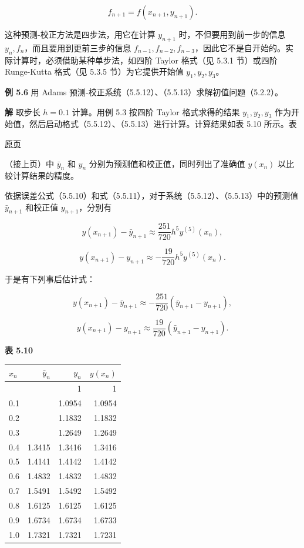 \documentclass[
  10pt,
  fontset=fandol]{ctexart}
\newcounter{none} %
\begin{document}
\[
f_{n+1}=f(x_{n+1},y_{n+1}).
\]

这种预测-校正方法是四步法，用它在计算 \(y_{n+1}\) 时，不但要用到前一步的信息 \(y_n,f_n\)，而且要用到更前三步的信息 \(f_{n-1},f_{n-2},f_{n-3}\)，因此它不是自开始的。实际计算时，必须借助某种单步法，如四阶 Taylor 格式（见 5.3.1 节）或四阶 Runge-Kutta 格式（见 5.3.5 节）为它提供开始值 \(y_1,y_2,y_3\)。

\textbf{例 5.6} 用 Adams 预测-校正系统（5.5.12）、（5.5.13）求解初值问题（5.2.2）。

\textbf{解} 取步长 \(h=0.1\) 计算。用例 5.3 按四阶 Taylor 格式求得的结果 \(y_1,y_2,y_3\) 作为开始值，然后启动格式（5.5.12）、（5.5.13）进行计算。计算结果如表 5.10 所示。表

\href{../../source-images/pdf-141.jpeg}{原页}

（接上页）中 \(\bar y_n\) 和 \(y_n\) 分别为预测值和校正值，同时列出了准确值 \(y(x_n)\) 以比较计算结果的精度。

依据误差公式（5.5.10）和式（5.5.11），对于系统（5.5.12）、（5.5.13）中的预测值 \(\bar y_{n+1}\) 和校正值 \(y_{n+1}\)，分别有

\[
y(x_{n+1})-\bar y_{n+1}\approx\frac{251}{720}h^5y^{(5)}(x_n),
\]

\[
y(x_{n+1})-y_{n+1}\approx-\frac{19}{720}h^5y^{(5)}(x_n).
\]

于是有下列事后估计式：

\[
y(x_{n+1})-\bar y_{n+1}\approx-\frac{251}{720}(\bar y_{n+1}-y_{n+1}),
\]

\[
y(x_{n+1})-y_{n+1}\approx\frac{19}{720}(\bar y_{n+1}-y_{n+1}).
\]

\textbf{表 5.10}

{\def\LTcaptype{none} %
\begin{longtable}[]{@{}lrrr@{}}
\toprule\noalign{}
\(x_n\) & \(\bar y_n\) & \(y_n\) & \(y(x_n)\) \\
\midrule\noalign{}
\endhead
\bottomrule\noalign{}
\endlastfoot
0 & & 1 & 1 \\
0.1 & & 1.0954 & 1.0954 \\
0.2 & & 1.1832 & 1.1832 \\
0.3 & & 1.2649 & 1.2649 \\
0.4 & 1.3415 & 1.3416 & 1.3416 \\
0.5 & 1.4141 & 1.4142 & 1.4142 \\
0.6 & 1.4832 & 1.4832 & 1.4832 \\
0.7 & 1.5491 & 1.5492 & 1.5492 \\
0.8 & 1.6125 & 1.6125 & 1.6125 \\
0.9 & 1.6734 & 1.6734 & 1.6733 \\
1.0 & 1.7321 & 1.7321 & 1.7231 \\
\end{longtable}
}
\end{document}
